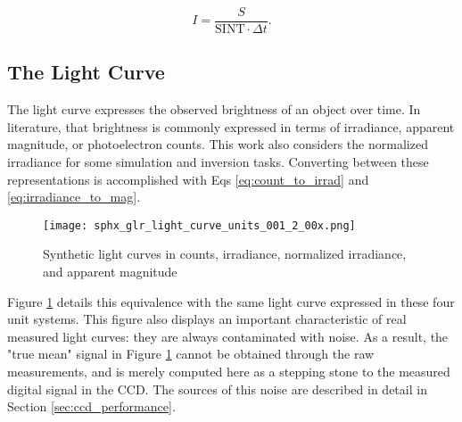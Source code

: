 \begin{equation} \label{eq:count_to_irrad}
  I = \frac{S}{\textrm{SINT} \cdot \Delta t}.
\end{equation}

\subsection{The Light Curve}

The light curve expresses the observed brightness of an object over time. In literature, that brightness is commonly expressed in terms of irradiance, apparent magnitude, or photoelectron counts. This work also considers the normalized irradiance for some simulation and inversion tasks. Converting between these representations is accomplished with Eqs \ref{eq:count_to_irrad} and \ref{eq:irradiance_to_mag}.

\begin{figure}[!htb]
  \centering
  \texttt{[image: sphx\_glr\_light\_curve\_units\_001\_2\_00x.png]}
  \caption{Synthetic light curves in counts, irradiance, normalized irradiance, and apparent magnitude}
  \label{fig:light_curve_units}
\end{figure}

Figure \ref{fig:light_curve_units} details this equivalence with the same light curve expressed in these four unit systems. This figure also displays an important characteristic of real measured light curves: they are always contaminated with noise. As a result, the "true mean" signal in Figure \ref{fig:light_curve_units} cannot be obtained through the raw measurements, and is merely computed here as a stepping stone to the measured digital signal in the CCD. The sources of this noise are described in detail in Section \ref{sec:ccd_performance}.

